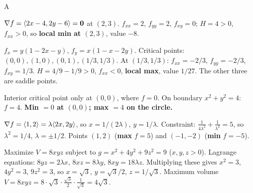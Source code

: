\documentclass[11pt]{article}
\begin{document}
\begin{answers}{A}
\item $\nabla f = \langle 2x - 4, 2y - 6\rangle = \mathbf{0}$ at $(2, 3)$. $f_{xx} = 2$, $f_{yy} = 2$, $f_{xy} = 0$; $H = 4 > 0$, $f_{xx} > 0$, so \textbf{local min at $(2,3)$}, value $-8$.
\item $f_x = y(1 - 2x - y)$, $f_y = x(1 - x - 2y)$. Critical points: $(0,0), (1,0), (0,1), (1/3, 1/3)$. At $(1/3,1/3)$: $f_{xx} = -2/3$, $f_{yy} = -2/3$, $f_{xy} = 1/3$. $H = 4/9 - 1/9 > 0$, $f_{xx} < 0$, \textbf{local max}, value $1/27$. The other three are saddle points.
\item Interior critical point only at $(0,0)$, where $f = 0$. On boundary $x^2 + y^2 = 4$: $f = 4$. \textbf{Min $= 0$ at $(0,0)$; max $= 4$ on the circle.}
\item $\nabla f = \langle 1, 2\rangle = \lambda \langle 2x, 2y\rangle$, so $x = 1/(2\lambda)$, $y = 1/\lambda$. Constraint: $\tfrac{1}{4\lambda^2} + \tfrac{1}{\lambda^2} = 5$, so $\lambda^2 = 1/4$, $\lambda = \pm 1/2$. Points $(1, 2)$ (\textbf{max} $f = 5$) and $(-1, -2)$ (\textbf{min} $f = -5$).
\item Maximize $V = 8xyz$ subject to $g = x^2 + 4y^2 + 9z^2 = 9$ ($x,y,z>0$). Lagrange equations: $8yz = 2\lambda x$, $8xz = 8\lambda y$, $8xy = 18\lambda z$. Multiplying these gives $x^2 = 3$, $4y^2 = 3$, $9z^2 = 3$, so $x = \sqrt 3$, $y = \sqrt 3/2$, $z = 1/\sqrt 3$. Maximum volume $V = 8 xyz = 8 \cdot \sqrt 3 \cdot \tfrac{\sqrt 3}{2} \cdot \tfrac{1}{\sqrt 3} = \boxed{4\sqrt 3}$.
\end{answers}
\end{document}
